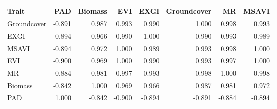 \captionsetup[table]{labelformat=empty,skip=1pt}
\begin{longtable}{lrrrrrrr}
\toprule
Trait & PAD & Biomass & EVI & EXGI & Groundcover & MR & MSAVI \\ 
\midrule
Groundcover & -0.891 & 0.987 & 0.993 & 0.990 & 1.000 & 0.998 & 0.993 \\ 
EXGI & -0.894 & 0.966 & 0.990 & 1.000 & 0.990 & 0.993 & 0.989 \\ 
MSAVI & -0.894 & 0.972 & 1.000 & 0.989 & 0.993 & 0.998 & 1.000 \\ 
EVI & -0.900 & 0.969 & 1.000 & 0.990 & 0.993 & 0.997 & 1.000 \\ 
MR & -0.884 & 0.981 & 0.997 & 0.993 & 0.998 & 1.000 & 0.998 \\ 
Biomass & -0.842 & 1.000 & 0.969 & 0.966 & 0.987 & 0.981 & 0.972 \\ 
PAD & 1.000 & -0.842 & -0.900 & -0.894 & -0.891 & -0.884 & -0.894 \\ 
\bottomrule
\end{longtable}


